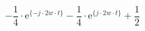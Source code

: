 \correct
\[
-\frac{1}{4}\cdot\textrm{e}^{\{-j \cdot 2w \cdot t \}}
-\frac{1}{4}\cdot\textrm{e}^{\{ j \cdot 2w \cdot t \}}
+\frac{1}{2}
\]
